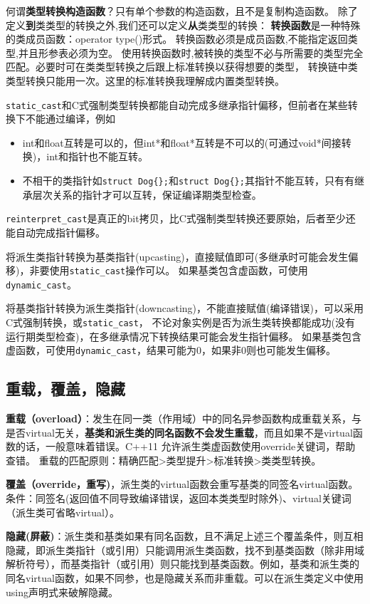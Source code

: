 何谓\textbf{类型转换构造函数}？只有单个参数的构造函数，且不是复制构造函数。
除了定义\textbf{到}类类型的转换之外,我们还可以定义\textbf{从}类类型的转换：
\textbf{转换函数}是一种特殊的类成员函数：operator type()形式。
转换函数必须是成员函数,不能指定返回类型,并且形参表必须为空。
使用转换函数时,被转换的类型不必与所需要的类型完全匹配。必要时可在类类型转换之后跟上标准转换以获得想要的类型，
转换链中类类型转换只能用一次。这里的标准转换我理解成内置类型转换。

\verb$static_cast$和C式强制类型转换都能自动完成多继承指针偏移，但前者在某些转换下不能通过编译，例如
\begin{itemize}
\item int和float互转是可以的，但int*和float*互转是不可以的(可通过void*间接转换)，int和指针也不能互转。
\item 不相干的类指针如\verb$struct Dog{};$和\verb$struct Dog{};$其指针不能互转，只有有继承层次关系的指针才可以互转，保证编译期类型检查。
\end{itemize}
\verb$reinterpret_cast$是真正的bit拷贝，比C式强制类型转换还要原始，后者至少还能自动完成指针偏移。


将派生类指针转换为基类指针(upcasting)，直接赋值即可(多继承时可能会发生偏移)，非要使用\verb$static_cast$操作可以。
如果基类包含虚函数，可使用\verb$dynamic_cast$。

将基类指针转换为派生类指针(downcasting)，不能直接赋值(编译错误)，可以采用C式强制转换，或\verb$static_cast$，
不论对象实例是否为派生类转换都能成功(没有运行期类型检查)，在多继承情况下转换结果可能会发生指针偏移。
如果基类包含虚函数，可使用\verb$dynamic_cast$，结果可能为0，如果非0则也可能发生偏移。



\subsection{重载，覆盖，隐藏}
\textbf{重载（overload）}：发生在同一类（作用域）中的同名异参函数构成重载关系，与是否virtual无关，\textbf{基类和派生类的同名函数不会发生重载}，而且如果不是virtual函数的话，一般意味着错误。C++11 允许派生类虚函数使用override关键词，帮助查错。
重载的匹配原则：精确匹配>类型提升>标准转换>类类型转换。

\textbf{覆盖（override，重写)}，派生类的virtual函数会重写基类的同签名virtual函数。条件：同签名(返回值不同导致编译错误，返回本类类型时除外)、virtual关键词（派生类可省略virtual）。


\textbf{隐藏(屏蔽)}：派生类和基类如果有同名函数，且不满足上述三个覆盖条件，则互相隐藏，即派生类指针（或引用）只能调用派生类函数，找不到基类函数（除非用域解析符号），而基类指针（或引用）则只能找到基类函数。例如，基类和派生类的同名virtual函数，如果不同参，也是隐藏关系而非重载。可以在派生类定义中使用using声明式来破解隐藏。

